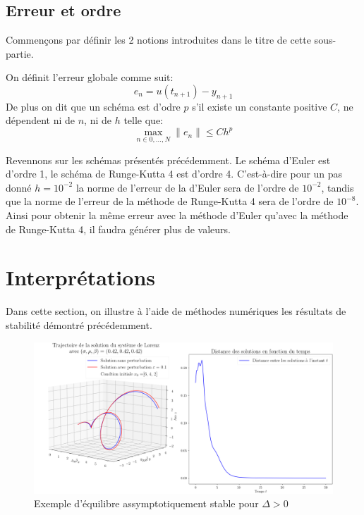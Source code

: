 \documentclass{article}
\newtheorem[M , nocut]{prop}{Proposition}[section]
\newtheorem[M , nocut]{definition}{Définition}
\newtheorem[M , nocut]{lemme}{Lemme}
\newtheorem[L , nocut]{thm}{Théoreme}
\newtheorem[M , nocut]{cor}{Corollaire}
\begin{document}
\subsection*{Erreur et ordre}

Commençons par définir les 2 notions introduites dans le titre de cette sous-partie.
\begin{definition}
    On définit l'erreur globale comme suit:
    $$ e_n = u(t_{n+1}) - y_{n+1} $$
    De plus on dit que un schéma est d'odre $p$ s'il existe un constante positive $C$, ne dépendent ni de $n$, ni de $h$ telle que:
    $$ \max_{n\in 0,\dots,N} \|e_n\| \le C h^p$$
\end{definition}
Revennons sur les schémas présentés précédemment. Le schéma d'Euler est d'ordre 1, le schéma de Runge-Kutta 4 est d'ordre 4. C'est-\`a-dire pour un pas donné $h=10^{-2}$ la norme de l'erreur de la d'Euler sera de l'ordre de $10^{-2}$, tandis que la norme de l'erreur de la méthode de Runge-Kutta 4 sera de l'ordre de $10^{-8}$. Ainsi pour obtenir la même erreur avec la méthode d'Euler qu'avec la méthode de Runge-Kutta 4, il faudra générer plus de valeurs.

\newpage
\section{Interprétations}
Dans cette section, on illustre à l'aide de méthodes numériques les résultats de stabilité démontré précédemment.

\begin{figure}[!ht]
    \label{fig:EqAS-Dsup0}
    \centering
    \includegraphics[width = \textwidth]{EqAS-Dsup0}
    \caption{Exemple d'équilibre assymptotiquement stable pour $\Delta>0$}
\end{figure}
\end{document}
